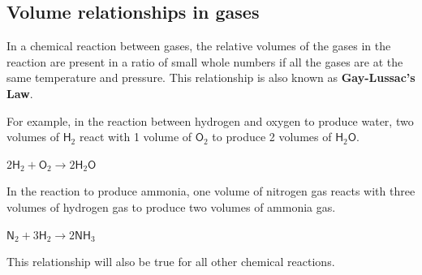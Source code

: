             \subsection*{Volume relationships in gases}
            \nopagebreak
      \label{m38711*id65179}In a chemical reaction between gases, the relative volumes of the gases in the reaction are present in a ratio of small whole numbers if all the gases are at the same temperature and pressure. This relationship is also known as \textbf{Gay-Lussac's Law}.\par 
      \label{m38711*id65189}For example, in the reaction between hydrogen and oxygen to produce water, two volumes of $\mathsf{H}{}_{2}$ react with 1 volume of $\mathsf{O}{}_{2}$ to produce 2 volumes of $\mathsf{H}{}_{2}\mathsf{O}$.\par 
      \label{m38711*id65237}$2\mathsf{H}{}_{2}+\mathsf{O}{}_{2}\to 2\mathsf{H}{}_{2}\mathsf{O}$\par 
      \label{m38711*id65282}In the reaction to produce ammonia, one volume of nitrogen gas reacts with three volumes of hydrogen gas to produce two volumes of ammonia gas.\par 
      \label{m38711*id65286}$\mathsf{N}{}_{2}+3\mathsf{H}{}_{2}\to 2\mathsf{NH}{}_{3}$
      \par 
      \label{m38711*id65329}This relationship will also be true for all other chemical reactions.\par 
    \label{m38711*cid8}
